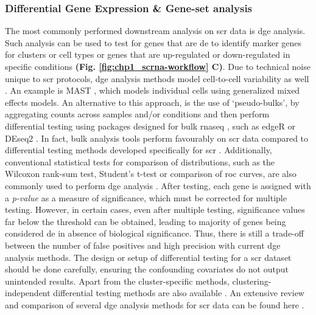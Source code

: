 \subsubsection{Differential Gene Expression \& Gene-set analysis}
The most commonly performed downstream analysis on \gls{scr} data is \gls{dge} analysis. Such analysis can be used to test for genes that are \gls{de} to identify marker genes for clusters or cell types or genes that are up-regulated or down-regulated in specific conditions \textbf{(Fig. \ref{fig:chp1_scrna-workflow} C)}. %
Due to technical noise unique to \gls{scr} protocols, \gls{dge} analysis methods model cell-to-cell variability as well \textbf{\cite{das_comprehensive_2021}}. An example is MAST \textbf{\cite{finak_mast_2015}}, which models individual cells using generalized mixed effects models. An alternative to this approach, is the use of `pseudo-bulks’, by aggregating counts across samples and/or conditions and then perform differential testing using packages designed for bulk \gls{rnaseq} \textbf{\cite{lueckenmalte_d_current_2019,heumos_best_2023}}, such as edgeR \textbf{\cite{robinson_edger_2009}} or DEseq2 \textbf{\cite{love_moderated_2014}}. In fact, bulk analysis tools perform favourably on \gls{scr} data compared to differential testing methods developed specifically for \gls{scr} \textbf{\cite{das_comprehensive_2021,squair_confronting_2021,van_den_berge_observation_2018,soneson_bias_2018}}. Additionally, conventional statistical tests for comparison of distributions, such as the Wilcoxon rank-sum test, Student's t-test or comparison of \gls{roc} curves, are also commonly used to perform \gls{dge} analysis \textbf{\cite{butler_integrating_2018}}. After testing, each gene is assigned with a \textit{p-value} as a measure of significance, which must be corrected for multiple testing. However, in certain cases, even after multiple testing, significance values far below the threshold can be obtained, leading to majority of genes being considered \gls{de} in absence of biological significance. Thus, there is still a trade-off between the number of false positives and high precision with current \gls{dge} analysis methods. The design or setup of differential testing for a \gls{scr} dataset should be done carefully, ensuring the confounding covariates do not output unintended results. Apart from the cluster-specific methods, clustering-independent differential testing methods are also available \textbf{\cite{vandenbon_clustering-independent_2020,kim_marcopolo_2022,vlot_cluster-independent_2022}}. An extensive review and comparison of several \gls{dge} analysis methods for \gls{scr} data can be found here \textbf{\cite{das_comprehensive_2021,squair_confronting_2021,wang_comparative_2019,das_differential_2022,nguyen_benchmarking_2023}}.\\

